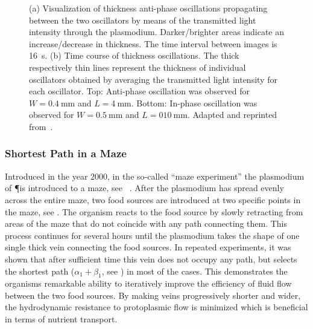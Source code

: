 			\begin{figure}
				\centering
				\newline
	
				\caption[Oscillator experiment - Thickness oscillations]{(a) Visualization of thickness anti-phase oscillations propagating between the two oscillators by means of the transmitted light intensity through the plasmodium. Darker/brighter areas indicate an increase/decrease in thickness. The time interval between images is \SI{16}{\second}. (b) Time course of thickness oscillations. The thick respectively thin lines represent the thickness of individual oscillators obtained by averaging the transmitted light intensity for each oscillator.
				Top: Anti-phase oscillation was observed for $W=\SI{0.4}{\milli\metre}$ and $L=\SI{4}{\milli\metre}$. Bottom: In-phase oscillation was observed for $W=\SI{0.5}{\milli\metre}$ and $L=\SI{010}{\milli\metre}$. Adapted and reprinted from~\cite{PhysRevLett.85.2026}.}
				\label{fig:oscillator_experiment_thickness}
			\end{figure}{}

			\FloatBarrier

		\subsubsection{Shortest Path in a Maze}

			Introduced in the year 2000, in the so-called ``maze experiment'' the plasmodium of \P is introduced to a maze, see ~\cite{nakagaki2000intelligence}. After the plasmodium has spread evenly across the entire maze, two food sources are introduced at two specific points in the maze, see . The organism reacts to the food source by slowly retracting from areas of the maze that do not coincide with any path connecting them. This process continues for several hours until the plasmodium takes the shape of one single thick vein connecting the food sources. In repeated experiments, it was shown that after sufficient time this vein does not occupy any path, but selects the shortest path ($\alpha_1 + \beta_1$, see ) in most of the cases. This demonstrates the organisms remarkable ability to iteratively improve the efficiency of fluid flow between the two food sources. By making veins progressively shorter and wider, the hydrodynamic resistance to protoplasmic flow is minimized which is beneficial in terms of nutrient transport\cite{kamiya1959motive}. 

